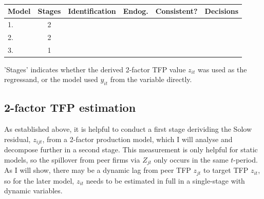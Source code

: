 \begin{table}[htbp]
    \begin{center}
        \begin{threeparttable}
            \caption{}
            \label{table:model-summary}
            \begin{tabular}{lcllcl}
                \toprule\toprule
                Model
                & Stages                             
                & Identification
                & Endog.
                & Consistent?
                & Decisions
                \\
                \hline
                1. \nameref{ss:model-lmm}
                & 2                                     \\
                2. \nameref{ss:model-dd}
                & 2                                     \\
                3. \nameref{ss:model-dynamic-panel}
                & 1                                     \\
                \bottomrule
            \end{tabular}
            \begin{tablenotes}
                \item 'Stages' indicates whether the derived 2-factor TFP value $z_{it}$
                was used as the regressand, or the model used $y_{it}$ from the  variable directly.
            \end{tablenotes}
        \end{threeparttable}
    \end{center}
\end{table}

\subsection{2-factor TFP estimation}

As established above, it is helpful to conduct a first stage
derividing the Solow residual, $z_{ijt}$, from a 2-factor production model,
which I will analyse and decompose further in a second stage.
This measurement is only helpful for static models,
so the spillover from peer firms via $Z_{jt}$ only occurs in the same $t$-period.
As I will show, there may be a dynamic lag from peer TFP $z_{jt}$
to target TFP $z_{it}$, so for the later model, $z_{it}$ needs to be estimated in full
in a single-stage with dynamic variables.

